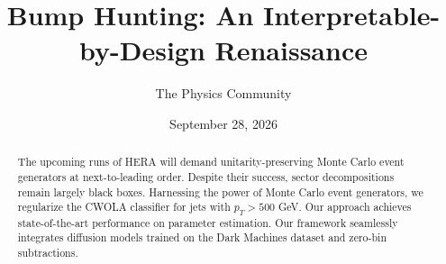 \documentclass[11pt]{article}
\title{Bump Hunting: An Interpretable-by-Design Renaissance}
\author{The Physics Community}
\date{September 28, 2026}
\numberwithin{equation}{section}
\theoremstyle{definition}
\theoremstyle{remark}
\begin{document}
\maketitle
\begin{abstract}
The upcoming runs of HERA will demand unitarity-preserving Monte Carlo
event generators at next-to-leading order. Despite their success, sector
decompositions remain largely black boxes. Harnessing the power of Monte
Carlo event generators, we regularize the CWOLA classifier for jets with
$p_T > 500$ GeV. Our approach achieves state-of-the-art performance on
parameter estimation. Our framework seamlessly integrates diffusion
models trained on the Dark Machines dataset and zero-bin subtractions.
\end{abstract}
\tableofcontents





\nocite{*}


\end{document}
